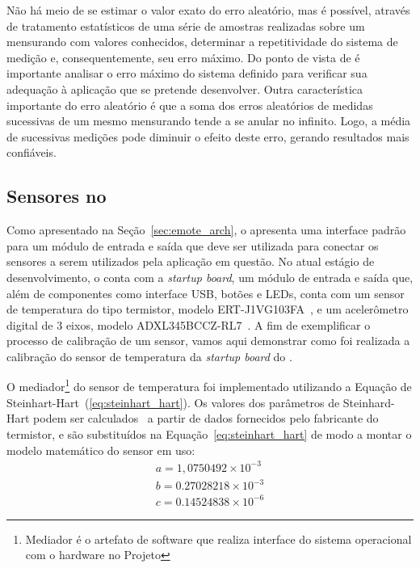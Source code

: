 Não há meio de se estimar o valor exato do erro aleatório, mas é possível,
através de tratamento estatísticos de uma série de amostras realizadas sobre um
mensurando com valores conhecidos, determinar a repetitividade do sistema de
medição e, consequentemente, seu erro máximo. Do ponto de vista de \rssf é
importante analisar o erro máximo do sistema definido para verificar sua
adequação à aplicação que se pretende desenvolver. Outra característica
importante do erro aleatório é que a soma dos erros aleatórios de medidas
sucessivas de um mesmo mensurando tende a se anular no infinito. Logo, a média
de sucessivas medições pode diminuir o efeito deste erro, gerando resultados
mais confiáveis.



\subsection{Sensores no \emote}

Como apresentado na Seção~\ref{sec:emote_arch}, o \emote apresenta uma interface
padrão para um módulo de entrada e saída que deve ser utilizada para conectar os
sensores a serem utilizados pela aplicação em questão. No atual estágio de
desenvolvimento, o \emote conta com a \emph{startup board}, um módulo de entrada
e saída que, além de componentes como interface USB, botões e LEDs, conta com um
sensor de temperatura do tipo termistor, modelo
ERT-J1VG103FA~\cite{Panasonic:ERTJ:2004}, e um acelerômetro digital de 3 eixos,
modelo ADXL345BCCZ-RL7~\cite{Analog:ADXL345:2009}. A fim de exemplificar o
processo de calibração de um sensor, vamos aqui demonstrar como foi realizada a
calibração do sensor de temperatura da \emph{startup board} do \emote.

O mediador\footnote{Mediador é o artefato de software que realiza interface do
sistema operacional com o hardware no Projeto \epos} do sensor de temperatura foi
implementado utilizando a Equação de Steinhart-Hart~(\ref{eq:steinhart_hart}).
Os valores dos parâmetros de Steinhard-Hart podem ser
calculados~\cite{Steinhart:1968} a partir de dados fornecidos pelo fabricante
do termistor, e são substituídos na Equação~\ref{eq:steinhart_hart} de modo a
montar o modelo matemático do sensor em uso:
\begin{eqnarray}
\label{eq:stnhrt_a}a = 1,0750492 \times 10^{-3}\\
\label{eq:stnhrt_b}b = 0.27028218 \times 10^{-3}\\
\label{eq:stnhrt_c}c = 0.14524838 \times 10^{-6}
\end{eqnarray}

